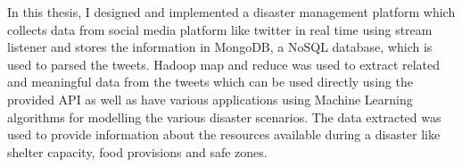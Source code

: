 % 
% 
%
In this thesis, I designed and implemented a disaster management platform which collects data from social media platform like twitter in real time using stream listener and stores the information in MongoDB, a NoSQL database, which is used to parsed the tweets. Hadoop map and reduce was used to extract related and meaningful data from the tweets which can be used directly using the provided API as well as have various applications using Machine Learning algorithms for modelling the various disaster scenarios. The data extracted was used to provide information about the resources available during a disaster like shelter capacity, food provisions and safe zones.
